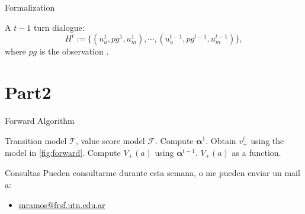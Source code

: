 \documentclass{beamer}
\begin{document}
\begin{frame}{Formalization}

\begin{definition}[Def1]
A $t-1$ turn dialogue:
\begin{equation}
    H^t := \{(u_u^{1}, pg^{1}, u_m^{1}), \cdots, (u_u^{t-1}, pg^{t-1}, u_m^{t-1})\},
\end{equation}
where $pg$ is the observation .
\end{definition}

\end{frame}

\section{Part2}


\begin{frame}[fragile]{Forward Algorithm}
\begin{algorithm}[H]%
\small
\caption{Forward algorithm.}
\label{alg:algorithm}
\begin{algorithmic}%

\REQUIRE Transition model $\mathcal{T}$, value score model $\mathcal{F}$.
\STATE Compute $\bm{\alpha}^1$.
    \STATE Obtain $v_+^i$ using the model in \ref{fig:forward}.
        \STATE Compute $V_+(a)$ using $\bm{\alpha}^{t-1}$.
    \ENDIF
\ENDFOR
\RETURN $V_+(a)$ as a function.

\end{algorithmic}
\end{algorithm}
\end{frame}


\begin{frame}{Consultas}
Pueden consultarme durante esta semana, o me pueden enviar un mail a:
        \begin{itemize}
            \item \href{mailto:mramos@frsf.utn.edu.ar}{mramos@frsf.utn.edu.ar}
        \end{itemize}
\end{frame}
\end{document}
